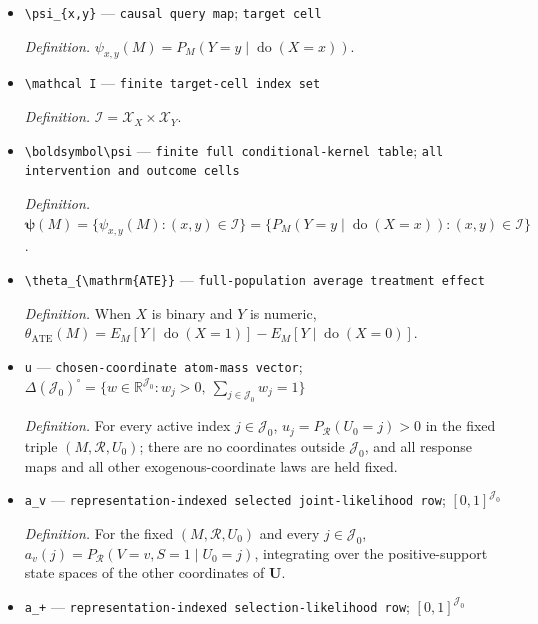 \documentclass{article}
\begin{document}
\begin{itemize}
  \item \texttt{\textbackslash{}\allowbreak{}psi\_\allowbreak{}\{x,\allowbreak{}y\}\allowbreak{}} --- \texttt{causal query map}; \texttt{target cell}
  \par\smallskip\noindent\emph{Definition.} \(\psi_{x,y}(M)=P_M(Y=y\mid\operatorname{do}(X=x))\).
  \item \texttt{\textbackslash{}\allowbreak{}mathcal I} --- \texttt{finite target-\allowbreak{}cell index set}
  \par\smallskip\noindent\emph{Definition.} \(\mathcal I=\mathcal X_X\times\mathcal X_Y\).
  \item \texttt{\textbackslash{}\allowbreak{}boldsymbol\textbackslash{}\allowbreak{}psi} --- \texttt{finite full conditional-\allowbreak{}kernel table}; \texttt{all intervention and outcome cells}
  \par\smallskip\noindent\emph{Definition.} \(\boldsymbol\psi(M)=\{\psi_{x,y}(M):(x,y)\in\mathcal I\}=\{P_M(Y=y\mid\operatorname{do}(X=x)):(x,y)\in\mathcal I\}\).
  \item \texttt{\textbackslash{}\allowbreak{}theta\_\allowbreak{}\{\textbackslash{}\allowbreak{}mathrm\{ATE\}\allowbreak{}\}\allowbreak{}} --- \texttt{full-\allowbreak{}population average treatment effect}
  \par\smallskip\noindent\emph{Definition.} When \(X\) is binary and \(Y\) is numeric, \(\theta_{\mathrm{ATE}}(M)=E_M[Y\mid\operatorname{do}(X=1)]-E_M[Y\mid\operatorname{do}(X=0)]\).
  \item \texttt{u} --- \texttt{chosen-\allowbreak{}coordinate atom-\allowbreak{}mass vector}; \(\Delta(\mathcal J_0)^{\circ}=\{w\in\mathbb R^{\mathcal J_0}:w_j>0,\ \sum_{j\in\mathcal J_0}w_j=1\}\)
  \par\smallskip\noindent\emph{Definition.} For every active index \(j\in\mathcal J_0\), \(u_j=P_{\mathcal R}(U_0=j)>0\) in the fixed triple \((M,\mathcal R,U_0)\); there are no coordinates outside \(\mathcal J_0\), and all response maps and all other exogenous-coordinate laws are held fixed.
  \item \texttt{a\_\allowbreak{}v} --- \texttt{representation-\allowbreak{}indexed selected joint-\allowbreak{}likelihood row}; \([0,1]^{\mathcal J_0}\)
  \par\smallskip\noindent\emph{Definition.} For the fixed \((M,\mathcal R,U_0)\) and every \(j\in\mathcal J_0\), \(a_v(j)=P_{\mathcal R}(V=v,S=1\mid U_0=j)\), integrating over the positive-support state spaces of the other coordinates of \(\mathbf U\).
  \item \texttt{a\_\allowbreak{}+\allowbreak{}} --- \texttt{representation-\allowbreak{}indexed selection-\allowbreak{}likelihood row}; \([0,1]^{\mathcal J_0}\)

\end{itemize}
\end{document}
